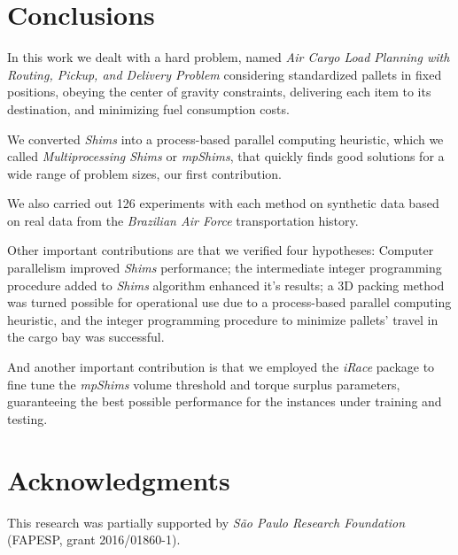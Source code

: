 \documentclass[preprint,authoryear]{elsarticle}
\begin{document}
\section{Conclusions}
\label{sec7}

In this work we dealt with a hard problem, named {\it Air Cargo Load Planning with Routing, Pickup, and Delivery Problem} considering standardized pallets in fixed positions, obeying the center of gravity constraints, delivering each item to its destination, and minimizing fuel consumption costs.

We converted {\it Shims} into a process-based parallel computing heuristic, which we called {\it Multiprocessing Shims} or {\it mpShims}, that quickly finds good solutions for a wide range of problem sizes, our first contribution.

We also carried out 126 experiments with each method on synthetic data based on real data from the {\it Brazilian Air Force} transportation history.

Other important contributions are that we verified four hypotheses: Computer parallelism improved {\it Shims} performance; the intermediate integer programming procedure added to {\it Shims} algorithm enhanced it's results; a 3D packing method was turned possible for operational use due to a process-based parallel computing heuristic, and the integer programming procedure to minimize pallets' travel in the cargo bay was successful.

And another important contribution is that we employed the {\it iRace} package to fine tune the {\it mpShims} volume threshold and torque surplus parameters, guaranteeing the best possible performance for the instances under training and testing.

\section*{Acknowledgments}

This research was partially supported by \textit{São Paulo Research Foundation} (FAPESP, grant 2016/01860-1).




\end{document}
